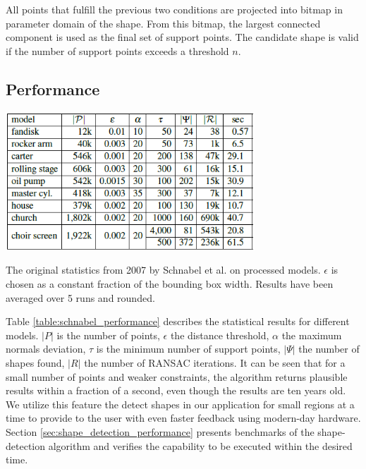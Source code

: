 \par

All points that fulfill the previous two conditions are projected into bitmap in parameter domain of the shape. From this bitmap, the largest connected component is used as the final set of support points. The candidate shape is valid if the number of support points exceeds a threshold $n$. 


\subsection{Performance}
\label{sec:performance}

\begin{table}
    \centering
    \includegraphics[width=0.7\textwidth]{Shape_Detection/schnabel-performance.png}
    \caption[Original statistics of the shape detection algorithm by Schabel et al.]{The original statistics  from 2007 by Schnabel et al. \cite{schnabel-2007-efficient} on processed models. $\epsilon$ is chosen as a constant fraction of the bounding box width. Results have been averaged over 5 runs and rounded.}
    \label{table:schnabel_performance}
\end{table}

Table \ref{table:schnabel_performance} describes the statistical results for different models. $|P|$ is the number of points, $\epsilon$ the distance threshold, $\alpha$ the maximum normals deviation, $\tau$ is the minimum number of support points, $|\Psi|$ the number of shapes found, $|R|$ the number of RANSAC iterations. 
It can be seen that for a small number of points and weaker constraints, the algorithm returns plausible results within a fraction of a second, even though the results are ten years old. We utilize this feature the detect shapes in our application for small regions at a time to provide to the user with even faster feedback using modern-day hardware. Section \ref{sec:shape_detection_performance} presents benchmarks of the shape-detection algorithm and verifies the capability to be executed within the desired time. 


